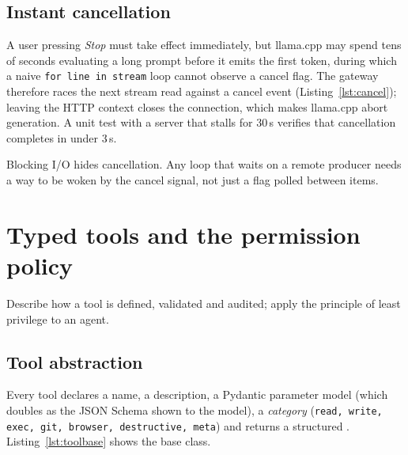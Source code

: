 \documentclass[11pt,a4paper]{article}
\newcommand{\code}[1]{\texttt{\detokenize{#1}}}
\begin{document}
\begin{lstlisting}[caption={JSON repair for model-generated tool arguments (excerpt from \texttt{backend/app/llm/toolparse.py}).},label={lst:repair}]
\end{lstlisting}


\subsection{Instant cancellation}
A user pressing \emph{Stop} must take effect immediately, but llama.cpp may spend tens of seconds evaluating a long prompt before it emits the first token, during which a naive
\texttt{for line in stream} loop cannot observe a cancel flag. The gateway therefore races the next stream read against a cancel event (Listing~\ref{lst:cancel}); leaving the HTTP context
closes the connection, which makes llama.cpp abort generation. A unit test with a server that stalls for 30\,s verifies that cancellation completes in under 3\,s.


\begin{lesson}
Blocking I/O hides cancellation. Any loop that waits on a remote producer needs a way to be woken by the cancel signal, not just a flag polled between items.
\end{lesson}

\section{Typed tools and the permission policy}\label{sec:tools}
\begin{objectives}
Describe how a tool is defined, validated and audited; apply the principle of least privilege to an agent.
\end{objectives}

\subsection{Tool abstraction}
Every tool declares a name, a description, a Pydantic parameter model (which doubles as the JSON Schema shown to the model), a \emph{category}
(\texttt{read, write, exec, git, browser, destructive, meta}) and returns a structured \code{ToolResult}. Listing~\ref{lst:toolbase} shows the base class.

\end{document}
